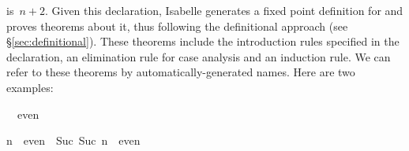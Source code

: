 \begin{isabellebody}
\begin{isamarkuptext}
is~$n+2$.  Given this declaration, Isabelle generates a fixed point
definition for  and proves theorems about it,
thus following the definitional approach (see {\S}\ref{sec:definitional}).
These theorems
include the introduction rules specified in the declaration, an elimination
rule for case analysis and an induction rule.  We can refer to these
theorems by automatically-generated names.  Here are two examples:
\begin{isabelle}%
{}\ {}\ even\par\smallskip%
n\ {}\ even\ {}\ Suc\ {}Suc\ n{}\ {}\ even%
\end{isabelle}


\end{isamarkuptext}
\end{isabellebody}
